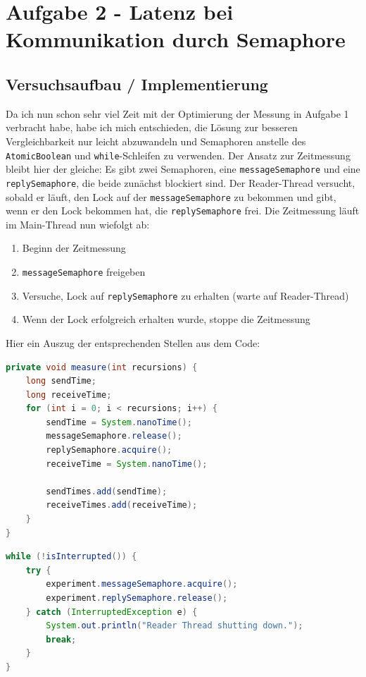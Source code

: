 \documentclass[12pt]{article}
\begin{document}
\section{Aufgabe 2 - Latenz bei Kommunikation durch Semaphore}
\subsection{Versuchsaufbau / Implementierung}

Da ich nun schon sehr viel Zeit mit der Optimierung der Messung in Aufgabe 1 verbracht habe, habe ich mich entschieden, die Lösung zur besseren Vergleichbarkeit nur leicht abzuwandeln und Semaphoren anstelle des \texttt{AtomicBoolean} und \texttt{while}-Schleifen zu verwenden.
Der Ansatz zur Zeitmessung bleibt hier der gleiche: 
Es gibt zwei Semaphoren, eine \texttt{messageSemaphore} und eine \texttt{replySemaphore}, die beide zunächst blockiert sind.
Der Reader-Thread versucht, sobald er läuft, den Lock auf der \texttt{messageSemaphore} zu bekommen und gibt, wenn er den Lock bekommen hat, die \texttt{replySemaphore} frei.
Die Zeitmessung läuft im Main-Thread nun wiefolgt ab:
\begin{enumerate}
	\item Beginn der Zeitmessung
	\item \texttt{messageSemaphore} freigeben
	\item Versuche, Lock auf \texttt{replySemaphore} zu erhalten (warte auf Reader-Thread)
	\item Wenn der Lock erfolgreich erhalten wurde, stoppe die Zeitmessung
\end{enumerate}

Hier ein Auszug der entsprechenden Stellen aus dem Code:

\begin{lstlisting}[language=java,caption={Semaphores: Latenzmessung im Main Thread}]
private void measure(int recursions) {
	long sendTime;
	long receiveTime;
	for (int i = 0; i < recursions; i++) {
		sendTime = System.nanoTime();
		messageSemaphore.release();
		replySemaphore.acquire();
		receiveTime = System.nanoTime();
		
		sendTimes.add(sendTime);
		receiveTimes.add(receiveTime);
	}
}
\end{lstlisting}

\begin{lstlisting}[language=java,caption={Freigeben der replySemaphore im Reader Thread}]
while (!isInterrupted()) {
	try {
		experiment.messageSemaphore.acquire();
		experiment.replySemaphore.release();
	} catch (InterruptedException e) {
		System.out.println("Reader Thread shutting down.");
		break;
	}
}
\end{lstlisting}
\end{document}
